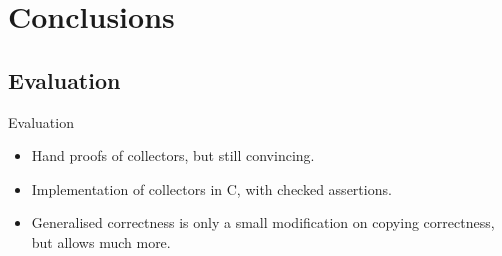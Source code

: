 \documentclass[usenames,dvipsnames]{beamer}
\begin{document}

\section{Conclusions}
\subsection{Evaluation}

\begin{frame}{Evaluation}
  \begin{itemize}
  \item Hand proofs of collectors, but still convincing.
  \item Implementation of collectors in C, with checked assertions.
  \item Generalised correctness is only a small modification on
    copying correctness, but allows much more.
  \end{itemize}




\end{frame}
\end{document}
